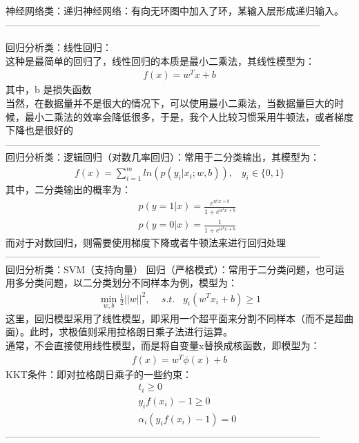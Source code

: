 \documentclass{article}
\begin{document}
\noindent 神经网络类：递归神经网络：有向无环图中加入了环，某输入层形成递归输入。\\
--------------------------------------------------------------------------------------------------


\noindent 回归分析类：线性回归：\\
这种是最简单的回归了，线性回归的本质是最小二乘法，其线性模型为：
\begin{eqnarray*}
f(x) = w^{T}x + b
\end{eqnarray*}
其中，b 是损失函数\\
当然，在数据量并不是很大的情况下，可以使用最小二乘法，当数据量巨大的时候，最小二乘法的效率会降低很多，于是，我个人比较习惯采用牛顿法，或者梯度下降也是很好的\\
--------------------------------------------------------------------------------------------------\\

\noindent 回归分析类：逻辑回归（对数几率回归）：常用于二分类输出，其模型为：\\
\begin{eqnarray*}
f(x) = \sum_{i=1}^{m}ln(p(y_{i}|x_{i};w,b)), \,\,\,\,\, y_{i}\in \{0,1\}
\end{eqnarray*}
其中，二分类输出的概率为：
\begin{eqnarray*}
&&p(y=1|x) = \frac{e^{w^{t}x+b}}{1+e^{w^{t}x+ b}}\\
&&p(y=0|x) = \frac{1}{1+e^{w^{t}x+ b}}
\end{eqnarray*}
而对于对数回归，则需要使用梯度下降或者牛顿法来进行回归处理\\
--------------------------------------------------------------------------------------------------\\

\noindent 回归分析类：SVM（支持向量） 回归（严格模式）：常用于二分类问题，也可运用多分类问题，以二分类划分不同样本为例，模型为：\\
\begin{eqnarray*}
\min_{w,b}\frac{1}{2}||w||^{2},\,\,\,\,\,\,\, s.t.\,\,\,\,\, y_{i}(w^{T}x_{i}+ b) \ge 1
\end{eqnarray*}
这里，回归模型采用了线性模型，即采用一个超平面来分割不同样本（而不是超曲面）。此时，求极值则采用拉格朗日乘子法进行运算。\\
通常，不会直接使用线性模型，而是将自变量x替换成核函数，即模型为：
\begin{eqnarray*}
f(x) = w^{T}\phi(x) + b
\end{eqnarray*}
KKT条件：即对拉格朗日乘子的一些约束：
\begin{eqnarray*}
&&t_{i} \ge 0\\
&&y_{i}f(x_{i}) - 1 \ge 0\\
&&\alpha_{i}(y_{i}f(x_{i}) - 1) = 0
\end{eqnarray*}
--------------------------------------------------------------------------------------------------\\
\end{document}
